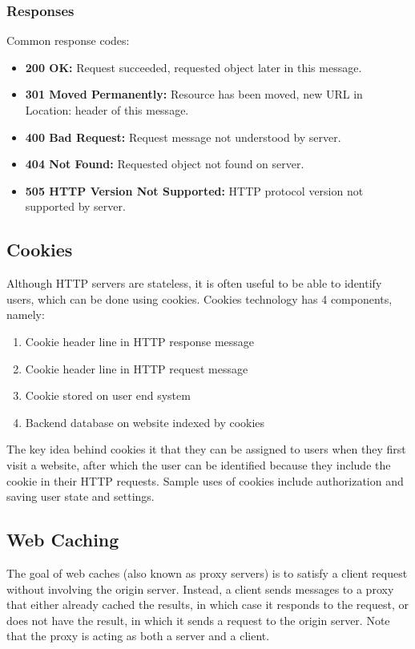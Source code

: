 \documentclass[12pt,titlepage]{article}
\begin{document}
      \subsubsection{Responses}
        Common response codes:
        \begin{itemize}
          \item \textbf{200 OK:} Request succeeded, requested object later in this message.
          \item \textbf{301 Moved Permanently:} Resource has been moved, new URL in Location: header of this message.
          \item \textbf{400 Bad Request:} Request message not understood by server.
          \item \textbf{404 Not Found:} Requested object not found on server.
          \item \textbf{505 HTTP Version Not Supported:} HTTP protocol version not supported by server.
        \end{itemize}

    \subsection{Cookies}
      Although HTTP servers are stateless, it is often useful to be able to identify users, which can be done using cookies. Cookies technology has 4 components, namely:
      \begin{enumerate}
        \item Cookie header line in HTTP response message
        \item Cookie header line in HTTP request message
        \item Cookie stored on user end system
        \item Backend database on website indexed by cookies
      \end{enumerate}
      The key idea behind cookies it that they can be assigned to users when they first visit a website, after which the user can be identified because they include the
      cookie in their HTTP requests. Sample uses of cookies include authorization and saving user state and settings.

    \subsection{Web Caching}
      The goal of web caches (also known as proxy servers) is to satisfy a client request without involving the origin server. Instead, a client sends messages to a proxy
      that either already cached the results, in which case it responds to the request, or does not have the result, in which it sends a request to the origin server. Note
      that the proxy is acting as both a server and a client.
\end{document}
